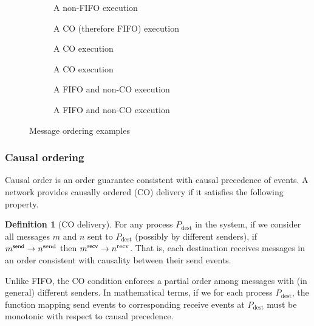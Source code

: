 \documentclass[]             %
{NASA}                       %
\theoremstyle{definition}
\newtheorem{definition}[theorem]{Definition}
\begin{document}
\begin{figure}[p]
  \setlength\abovecaptionskip{0ex}
  \setlength\belowcaptionskip{4ex}
  \begin{subfigure}[t]{0.475\textwidth}
    \centering
    
    \caption{A non-FIFO execution}
    \label{fig:ordex-non-fifo}
  \end{subfigure}
  \begin{subfigure}[t]{0.475\textwidth}
  \centering
  
  \caption{A CO (therefore FIFO) execution}
  \label{fig:ordex-co-1}
\end{subfigure}
\begin{subfigure}[b]{0.475\textwidth}
  \centering
  
  \caption{A CO execution}
  \label{fig:ordex-co-2}
\end{subfigure}
\begin{subfigure}[b]{0.475\textwidth}
  \centering
  
  \caption{A CO execution}
  \label{fig:ordex-co-3}
\end{subfigure}
\begin{subfigure}[b]{0.475\textwidth}
  \centering
  
  \caption{A FIFO and non-CO execution}
  \label{fig:ordex-non-co-1}
\end{subfigure}\hfill
\begin{subfigure}[b]{0.475\textwidth}
  \centering
  
  \caption{A FIFO and non-CO execution}
  \label{fig:ordex-non-co-2}
\end{subfigure}
\caption{Message ordering examples}
\label{fig:message-ordering}
\end{figure}

\subsubsection{Causal ordering}
Causal order is an order guarantee consistent with causal precedence
of events. A network provides causally ordered (CO) delivery if it
satisfies the following property.
\begin{definition}[CO delivery]
  \label{def:causalorder}
  For any process $P_\mathrm{dest}$ in the system, if we consider all
  messages $m$ and $n$ sent to $P_\mathrm{dest}$ (possibly by
  different senders), if $m_{}^{\mathsf{send}} \to n^\textrm{send}$ then
  $m_{}^{\mathsf{recv}} \to n^\textrm{recv}$. That is, each destination receives
  messages in an order consistent with causality between their send
  events.
\end{definition}
Unlike FIFO, the CO condition enforces a partial order among messages
with (in general) different senders. In mathematical terms, if we for
each process $P_{\mathrm{dest}}$, the function mapping send events to
corresponding receive events at $P_{\mathrm{dest}}$ must be monotonic
with respect to causal precedence.
\end{document}
